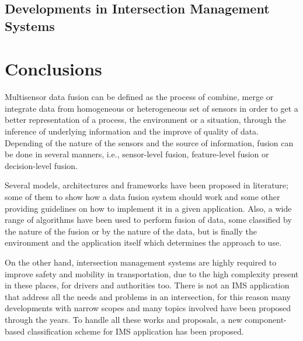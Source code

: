 
\subsection{Developments in Intersection Management Systems}

\section{Conclusions}

Multisensor data fusion can be defined as the process of combine, merge or integrate data from homogeneous or heterogeneous set of sensors in order to get a better representation of a process, the environment or a situation, through the inference of underlying information and the improve of quality of data. Depending of the nature of the sensors and the source of information, fusion can be done in several manners, i.e., sensor-level fusion, feature-level fusion or decision-level fusion.

Several models, architectures and frameworks have been proposed in literature; some of them to show how a data fusion system should work and some other providing guidelines on how to implement it in a given application. Also, a wide range of algorithms have been used to perform fusion of data, some classified by the nature of the fusion or by the nature of the data, but is finally the environment and the application itself which determines the approach to use.

On the other hand, intersection management systems are highly required to improve safety and mobility in transportation, due to the high complexity present in these places, for drivers and authorities too. There is not an IMS application that address all the needs and problems in an intersection, for this reason many developments with narrow scopes and many topics involved have been proposed through the years. To handle all these works and proposals, a new component-based classification scheme for IMS application has been proposed.
%